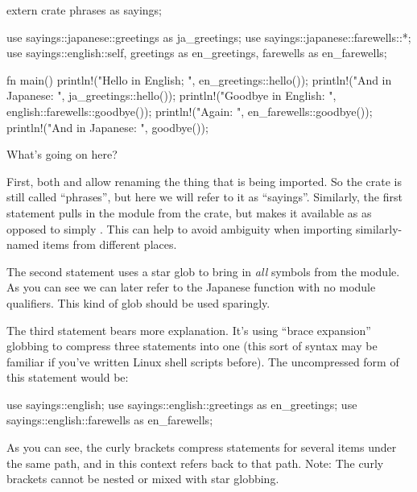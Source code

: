 \begin{rustc}
extern crate phrases as sayings;

use sayings::japanese::greetings as ja_greetings;
use sayings::japanese::farewells::*;
use sayings::english::{self, greetings as en_greetings, farewells as en_farewells};

fn main() {
    println!("Hello in English; {}", en_greetings::hello());
    println!("And in Japanese: {}", ja_greetings::hello());
    println!("Goodbye in English: {}", english::farewells::goodbye());
    println!("Again: {}", en_farewells::goodbye());
    println!("And in Japanese: {}", goodbye());
}
\end{rustc}

What's going on here?

\blank

First, both  and  allow renaming the thing that is being imported. So the crate is still called \enquote{phrases}, 
but here we will refer to it as \enquote{sayings}. Similarly, the first  statement pulls in the  module 
from the crate, but makes it available as  as opposed to simply . This can help to avoid ambiguity 
when importing similarly-named items from different places.

\blank

The second  statement uses a star glob to bring in \emph{all} symbols from the  module. As 
you can see we can later refer to the Japanese  function with no module qualifiers. This kind of glob should be used sparingly.

\blank

The third  statement bears more explanation. It's using \enquote{brace expansion} globbing to compress three  statements 
into one (this sort of syntax may be familiar if you've written Linux shell scripts before). The uncompressed form of this statement would be:

\begin{rustc}
use sayings::english;
use sayings::english::greetings as en_greetings;
use sayings::english::farewells as en_farewells;
\end{rustc}

As you can see, the curly brackets compress  statements for several items under the same path, and in this context  
refers back to that path. Note: The curly brackets cannot be nested or mixed with star globbing.
